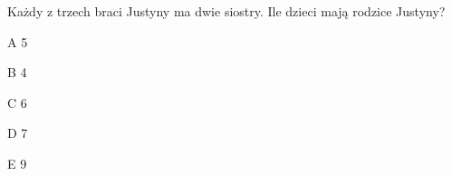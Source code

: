 \begin{tresc}
Każdy z trzech braci Justyny ma dwie siostry. Ile dzieci mają rodzice Justyny?
\end{tresc}
\begin{wariant}{A} 5 \end{wariant}
\begin{wariant}{B} 4 \end{wariant}
\begin{wariant}{C} 6 \end{wariant}
\begin{wariant}{D} 7 \end{wariant}
\begin{wariant}{E} 9 \end{wariant}

